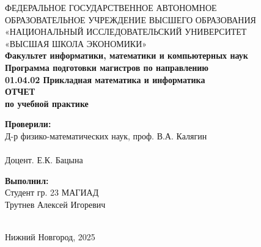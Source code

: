 \begin{titlepage}

    \begin{center}
        ФЕДЕРАЛЬНОЕ  ГОСУДАРСТВЕННОЕ АВТОНОМНОЕ \\
        ОБРАЗОВАТЕЛЬНОЕ УЧРЕЖДЕНИЕ
        ВЫСШЕГО ОБРАЗОВАНИЯ
        «НАЦИОНАЛЬНЫЙ ИССЛЕДОВАТЕЛЬСКИЙ УНИВЕРСИТЕТ \\
        «ВЫСШАЯ ШКОЛА ЭКОНОМИКИ»
\\
\vspace{10mm}
        \textbf{
            Факультет информатики, математики и компьютерных наук \\
            Программа подготовки магистров по направлению \\
            01.04.02 Прикладная математика и информатика
        }
        \\
        \vspace{20mm}
        \textbf{ОТЧЕТ}
        \\
        \textbf{по учебной практике}
        \vspace{10mm}
    \end{center}

\vspace{50mm}

\hfill
\begin{minipage}{0.4\textwidth}
    \begin{flushleft}
        \textbf{Проверили:} \\
        Д-р физико-математических наук, проф. В.А. Калягин \\
        \signatureline[6cm]{}
        \\
        Доцент. Е.К. Бацына \\
        \signatureline[6cm]{}
    \end{flushleft}
\end{minipage}
\hfill
\begin{minipage}{0.4\textwidth}
    \begin{flushright}
        \textbf{Выполнил:} \\
        Студент гр. 23 МАГИАД \\
        Трутнев Алексей Игоревич \\
        \signatureline[6cm]{}
        \\
    \end{flushright}
\end{minipage}

\begin{center}
    \vspace*{\fill}
    Нижний Новгород, 2025
\end{center}

\end{titlepage}


